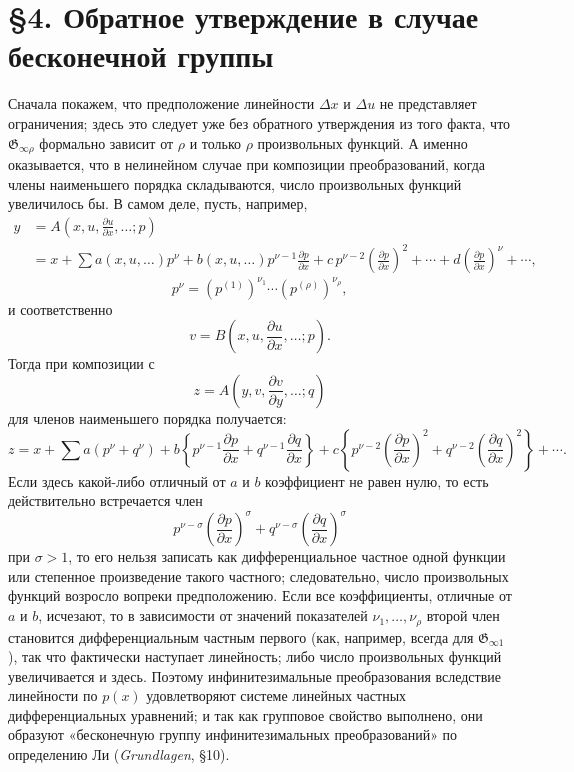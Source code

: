 \documentclass[11pt]{article}
\providecommand{\G}{\mathfrak G}
\providecommand{\D}{\Delta}
\providecommand{\p}{\partial}
\begin{document}
\section*{\S{}4. Обратное утверждение в случае бесконечной группы}

Сначала покажем, что предположение линейности \(\D x\) и \(\D u\) не представляет ограничения; здесь это следует уже без обратного утверждения из того факта, что \(\G_{\infty\rho}\) формально зависит от \(\rho\) и только \(\rho\) произвольных функций. А именно оказывается, что в нелинейном случае при композиции преобразований, когда члены наименьшего порядка складываются, число произвольных функций увеличилось бы. В самом деле, пусть, например,
\[
\begin{aligned}
y&=A\!\left(x,u,\frac{\p u}{\p x},\ldots;p\right)\\
&=x+\sum a(x,u,\ldots)p^\nu
+b(x,u,\ldots)p^{\nu-1}\frac{\p p}{\p x}
+c\,p^{\nu-2}\left(\frac{\p p}{\p x}\right)^2+\cdots
+d\left(\frac{\p p}{\p x}\right)^\nu+\cdots,
\end{aligned}
\]
\[
p^\nu=(p^{(1)})^{\nu_1}\cdots(p^{(\rho)})^{\nu_\rho},
\]
и соответственно
\[
v=B\!\left(x,u,\frac{\p u}{\p x},\ldots;p\right).
\]
Тогда при композиции с
\[
z=A\!\left(y,v,\frac{\p v}{\p y},\ldots;q\right)
\]
для членов наименьшего порядка получается:
\[
z=x+\sum a(p^\nu+q^\nu)+
b\left\{p^{\nu-1}\frac{\p p}{\p x}+q^{\nu-1}\frac{\p q}{\p x}\right\}
+c\left\{p^{\nu-2}\left(\frac{\p p}{\p x}\right)^2
+q^{\nu-2}\left(\frac{\p q}{\p x}\right)^2\right\}+\cdots.
\]
Если здесь какой-либо отличный от \(a\) и \(b\) коэффициент не равен нулю, то есть действительно встречается член
\[
p^{\nu-\sigma}\left(\frac{\p p}{\p x}\right)^\sigma
+q^{\nu-\sigma}\left(\frac{\p q}{\p x}\right)^\sigma
\]
при \(\sigma>1\), то его нельзя записать как дифференциальное частное одной функции или степенное произведение такого частного; следовательно, число произвольных функций возросло вопреки предположению. Если все коэффициенты, отличные от \(a\) и \(b\), исчезают, то в зависимости от значений показателей \(\nu_1,\ldots,\nu_\rho\) второй член становится дифференциальным частным первого (как, например, всегда для \(\G_{\infty1}\)), так что фактически наступает линейность; либо число произвольных функций увеличивается и здесь. Поэтому инфинитезимальные преобразования вследствие линейности по \(p(x)\) удовлетворяют системе линейных частных дифференциальных уравнений; и так как групповое свойство выполнено, они образуют «бесконечную группу инфинитезимальных преобразований» по определению Ли (\emph{Grundlagen}, \S{}10).
\end{document}
